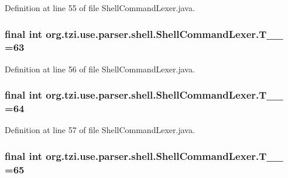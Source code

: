 Definition at line 55 of file Shell\-Command\-Lexer.\-java.

\hypertarget{classorg_1_1tzi_1_1use_1_1parser_1_1shell_1_1_shell_command_lexer_a6e639fdce6d3fbea35035b2fb6fa08b3}{
\subsubsection[{T\-\_\-\-\_\-63}]{\setlength{\rightskip}{0pt plus 5cm}final int org.\-tzi.\-use.\-parser.\-shell.\-Shell\-Command\-Lexer.\-T\-\_\-\-\_ =63\hspace{0.3cm}{\ttfamily [static]}}}\label{classorg_1_1tzi_1_1use_1_1parser_1_1shell_1_1_shell_command_lexer_a6e639fdce6d3fbea35035b2fb6fa08b3}


Definition at line 56 of file Shell\-Command\-Lexer.\-java.

\hypertarget{classorg_1_1tzi_1_1use_1_1parser_1_1shell_1_1_shell_command_lexer_abec34742f0e231856f0a9402e417317e}{
\subsubsection[{T\-\_\-\-\_\-64}]{\setlength{\rightskip}{0pt plus 5cm}final int org.\-tzi.\-use.\-parser.\-shell.\-Shell\-Command\-Lexer.\-T\-\_\-\-\_ =64\hspace{0.3cm}{\ttfamily [static]}}}\label{classorg_1_1tzi_1_1use_1_1parser_1_1shell_1_1_shell_command_lexer_abec34742f0e231856f0a9402e417317e}


Definition at line 57 of file Shell\-Command\-Lexer.\-java.

\hypertarget{classorg_1_1tzi_1_1use_1_1parser_1_1shell_1_1_shell_command_lexer_af728c81071e3f294b201b5f6bffc966e}{
\subsubsection[{T\-\_\-\-\_\-65}]{\setlength{\rightskip}{0pt plus 5cm}final int org.\-tzi.\-use.\-parser.\-shell.\-Shell\-Command\-Lexer.\-T\-\_\-\-\_ =65\hspace{0.3cm}{\ttfamily [static]}}}\label{classorg_1_1tzi_1_1use_1_1parser_1_1shell_1_1_shell_command_lexer_af728c81071e3f294b201b5f6bffc966e}


